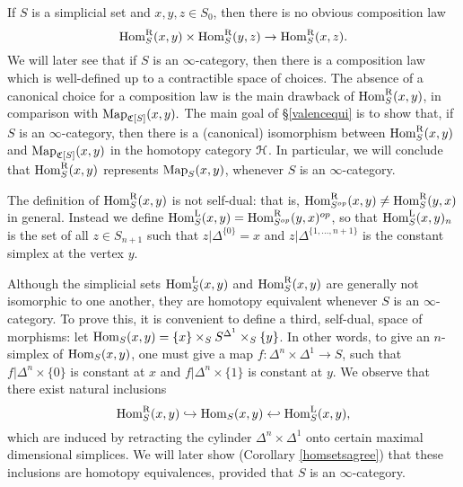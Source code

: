 \begin{1.2.2 Mapping spaces}
\begin{remark}\label{needie}
If $S$ is a simplicial set and $x,y,z \in S_0$, then there is no
obvious composition law
$$\operatorname{Hom}^{\operatorname{R}}_{S}(x,y) \times \operatorname{Hom}^{\operatorname{R}}_{S}(y,z) \rightarrow \operatorname{Hom}^{\operatorname{R}}_{S}(x,z).$$
We will later see that if $S$ is an $\infty$-category, then there is a
composition law which is well-defined up to a
contractible space of choices. The absence of a canonical choice for a composition
law is the main drawback of $\operatorname{Hom}^{\operatorname{R}}_{S}(x,y)$, in comparison with
$\operatorname{{Map}}_{\operatorname{\mathfrak{C}}[S]}(x,y).$
The main goal of \S \ref{valencequi} is to show that, if $S$ is an $\infty$-category, then there is a 
(canonical) isomorphism between $\operatorname{Hom}^{\operatorname{R}}_{S}(x,y)$ and $\operatorname{{Map}}_{\operatorname{\mathfrak{C}}[S]}(x,y)$
in the homotopy category $\operatorname{\mathcal{H}}$. In particular, we will conclude that
$\operatorname{Hom}^{\operatorname{R}}_{S}(x,y)$ represents $\operatorname{{Map}}_{S}(x,y)$, whenever $S$ is an $\infty$-category.
\end{remark}

\begin{remark}\label{swink}
The definition of $\operatorname{Hom}^{\operatorname{R}}_{S}(x,y)$ is not self-dual: that
is, $\operatorname{Hom}^{\operatorname{R}}_{S^{op}}(x,y) \neq \operatorname{Hom}^{\operatorname{R}}_{S}(y,x)$ in
general. Instead we define $\operatorname{Hom}^{\operatorname{L}}_S(x,y) =
\operatorname{Hom}^{\operatorname{R}}_{S^{op}}(y,x)^{op}$, so that $\operatorname{Hom}^{\operatorname{L}}_{S}(x,y)_n$ is
the set of all $z \in S_{n+1}$ such that $z|\Delta^{ \{0\} } = x$
and $z | \Delta^{ \{1, \ldots, n+1\} }$ is the constant simplex at
the vertex $y$. \end{remark}

Although the simplicial sets $\operatorname{Hom}^{\operatorname{L}}_S(x,y)$ and
$\operatorname{Hom}^{\operatorname{R}}_S(x,y)$ are generally not isomorphic to one another,
they are homotopy equivalent whenever $S$ is an $\infty$-category. To
prove this, it is convenient to define a third, self-dual, space
of morphisms: let $\operatorname{Hom}_{S}(x,y) = \{x\} \times_S S^{\Delta^1}
\times_S \{y\}$. In other words, to give an $n$-simplex of
$\operatorname{Hom}_{S}(x,y)$, one must give a map $f: \Delta^n \times \Delta^1
\rightarrow S$, such that $f| \Delta^n \times \{0\}$ is constant
at $x$ and $f| \Delta^n \times \{1\}$ is constant at $y$. We
observe that there exist natural inclusions
$$ \operatorname{Hom}^{\operatorname{R}}_{S}(x,y) \hookrightarrow \operatorname{Hom}_S(x,y) \hookleftarrow
\operatorname{Hom}^{\operatorname{L}}_{S}(x,y),$$ 
which are induced by retracting the cylinder $\Delta^n \times \Delta^1$ onto certain maximal dimensional simplices. We will later show (Corollary
\ref{homsetsagree}) that these inclusions are homotopy
equivalences, provided that $S$ is an $\infty$-category.
\end{1.2.2 Mapping spaces}
